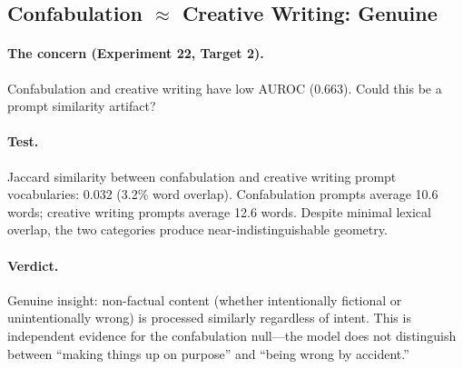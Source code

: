 \subsection{Confabulation $\approx$ Creative Writing: Genuine}
\label{sec:confab_creative}

\paragraph{The concern (Experiment 22, Target 2).} Confabulation and creative writing have low AUROC (0.663). Could this be a prompt similarity artifact?

\paragraph{Test.} Jaccard similarity between confabulation and creative writing prompt vocabularies: 0.032 (3.2\% word overlap). Confabulation prompts average 10.6 words; creative writing prompts average 12.6 words. Despite minimal lexical overlap, the two categories produce near-indistinguishable geometry.

\paragraph{Verdict.} Genuine insight: non-factual content (whether intentionally fictional or unintentionally wrong) is processed similarly regardless of intent. This is independent evidence for the confabulation null---the model does not distinguish between ``making things up on purpose'' and ``being wrong by accident.''
